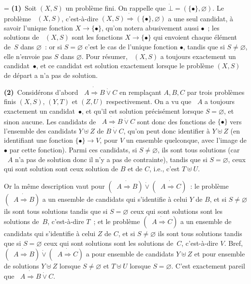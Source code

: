 \documentclass[12pt,a4paper]{article}
\theoremstyle{definition}
\newcommand{\dottedlimp}{\mathbin{\dot\Rightarrow}}
\newcommand{\dottedlor}{\mathbin{\dot\lor}}
\newcommand{\dottedbot}{\mathord{\dot\bot}}
\newcommand{\dottedneg}{\mathop{\dot\neg}}
\newif\ifcorrige
\newenvironment{corrige}%
{\ifcorrige\relax\else\setbox0=\vbox\bgroup\fi%
\smallbreak\footnotesize\noindent{\underbar{\textit{Corrigé.}}\quad}}
{{\hbox{}\nobreak\hfill\checkmark}%
\ifcorrige\relax\else\egroup\fi\par}
\begin{document}
\begin{corrige}
\textbf{(1)} Soit $(X,S)$ un problème fini.  On rappelle que
$\dottedbot = (\{\bullet\},\varnothing)$.  Le problème
$\dottedneg(X,S)$, c'est-à-dire $(X,S) \dottedlimp
(\{\bullet\},\varnothing)$ a une seul candidat, à savoir l'unique
fonction $X \to \{\bullet\}$, qu'on notera abusivement aussi
$\bullet$ ; les solutions de $\dottedneg(X,S)$ sont les fonctions $X
\to \{\bullet\}$ qui envoient chaque élément de $S$ dans
$\varnothing$ : or si $S = \varnothing$ c'est le cas de l'unique
fonction $\bullet$, tandis que si $S \neq \varnothing$, elle n'envoie
pas $S$ dans $\varnothing$.  Pour résumer, $\dottedneg(X,S)$ a
toujours exactement un candidat $\bullet$, et ce candidat est solution
exactement lorsque le problème $(X,S)$ de départ a n'a pas de
solution.

\textbf{(2)} Considérons d'abord $\dottedneg A \dottedlimp B\dottedlor
C$ en remplaçant $A,B,C$ par trois problèmes finis $(X,S)$, $(Y,T)$ et
$(Z,U)$ respectivement.  On a vu que $\dottedneg A$ a toujours
exactement un candidat $\bullet$, et qu'il est solution précisément
lorsque $S = \varnothing$, et sinon aucune.  Les candidats de
$\dottedneg A \dottedlimp B\dottedlor C$ sont donc des fonctions de
$\{\bullet\}$ vers l'ensemble des candidats $Y \uplus Z$ de
$B\dottedlor C$, qu'on peut donc identifier à $Y \uplus Z$ (en
identifiant une fonction $\{\bullet\} \to V$, pour $V$ un ensemble
quelconque, avec l'image de $\bullet$ par cette fonction).  Parmi ces
candidats, si $S \neq\varnothing$, ils sont tous solutions (car
$\dottedneg A$ n'a pas de solution donc il n'y a pas de contrainte),
tandis que si $S = \varnothing$, ceux qui sont solution sont ceux
solution de $B$ et de $C$, i.e., c'est $T\uplus U$.

Or la même description vaut pour $(\dottedneg A\dottedlimp B)
\dottedlor (\dottedneg A\dottedlimp C)$ : le problème $(\dottedneg
A\dottedlimp B)$ a un ensemble de candidats qui s'identifie à celui
$Y$ de $B$, et si $S \neq\varnothing$ ils sont tous solutions tandis
que si $S = \varnothing$ ceux qui sont solutions sont les solutions
de $B$, c'est-à-dire $T$ ; et le problème $(\dottedneg A\dottedlimp
C)$ a un ensemble de candidats qui s'identifie à celui $Z$ de $C$, et
si $S \neq\varnothing$ ils sont tous solutions tandis que si $S =
\varnothing$ ceux qui sont solutions sont les solutions de $C$,
c'est-à-dire $V$.  Bref, $(\dottedneg A\dottedlimp B) \dottedlor
(\dottedneg A\dottedlimp C)$ a pour ensemble de candidats $Y \uplus Z$
et pour ensemble de solutions $Y\uplus Z$ lorsque $S \neq\varnothing$
et $T\uplus U$ lorsque $S = \varnothing$.  C'est exactement pareil que
$\dottedneg A \dottedlimp B\dottedlor C$.


\end{corrige}
\end{document}
